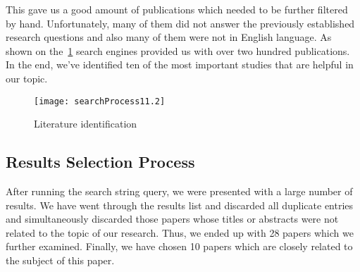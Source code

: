 This gave us a good amount of publications which needed to be further filtered by hand. Unfortunately, many of them did not answer the previously established research questions and also many of them were not in English language. As shown on the~\ref{fig:literature-identification} search engines provided us with over two hundred publications. In the end, we've identified ten of the most important studies that are helpful in our topic.

\begin{figure}[htp]
\centering
\texttt{[image: searchProcess11.2]}
\caption{Literature identification}
\label{fig:literature-identification}
\end{figure}

\subsection{Results Selection Process}
After running the search string query, we were presented with a large number of results. We have went through the results list and discarded all duplicate entries and simultaneously discarded those papers whose titles or abstracts were not related to the topic of our research. Thus, we ended up with 28 papers which we further examined. Finally, we have chosen 10 papers which are closely related to the subject of this paper.
